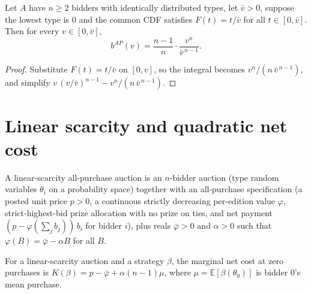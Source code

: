 \begin{theorem}\label{thm:MathEconLib.Auction.allPayBid_uniform}
\leanok
{}
Let $A$ have $n \ge 2$ bidders with identically distributed types, let $\bar v > 0$, suppose the lowest type is $0$ and the common CDF satisfies $F(t) = t/\bar v$ for all $t \in [0,\bar v]$. Then for every $v \in [0,\bar v]$,
\[
  b^{AP}(v) = \frac{n-1}{n}\cdot \frac{v^n}{\bar v^{\,n-1}} .
\]
\end{theorem}
\begin{proof}
\leanok
{}
Substitute $F(t) = t/\bar v$ on $[0,v]$, so the integral becomes $v^n/(n\,\bar v^{\,n-1})$, and simplify $v\,(v/\bar v)^{n-1} - v^n/(n\,\bar v^{\,n-1})$.
\end{proof}

\section{Linear scarcity and quadratic net cost}

\begin{definition}\label{def:MathEconLib.LinearScarcityAuction}
\leanok
{}
A linear-scarcity all-purchase auction is an $n$-bidder auction (type random variables $\theta_i$ on a probability space) together with an all-purchase specification (a posted unit price $p > 0$, a continuous strictly decreasing per-edition value $\varphi$, strict-highest-bid prize allocation with no prize on ties, and net payment $(p - \varphi(\sum_j b_j))\,b_i$ for bidder $i$), plus reals $\bar\varphi > 0$ and $\alpha > 0$ such that $\varphi(B) = \bar\varphi - \alpha B$ for all $B$.
\end{definition}

\begin{definition}\label{def:MathEconLib.LinearScarcityAuction.K_linear}
\leanok
{}
For a linear-scarcity auction and a strategy $\beta$, the marginal net cost at zero purchases is $K(\beta) = p - \bar\varphi + \alpha (n-1)\mu$, where $\mu = \mathbb E[\beta(\theta_0)]$ is bidder $0$'s mean purchase.
\end{definition}

